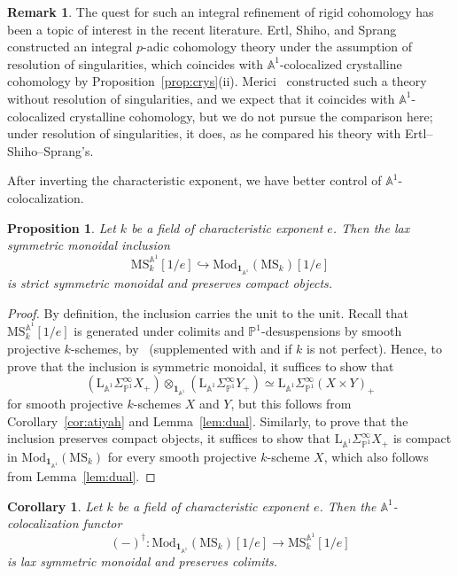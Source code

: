 \documentclass{amsart}
\numberwithin{equation}{section}
\theoremstyle{plain}
\newtheorem{proposition}[equation]{Proposition}
\newtheorem{corollary}[equation]{Corollary}
\theoremstyle{definition}
\newtheorem{remark}[equation]{Remark}
\let\bb=\mathbb
\def\A{\bb A}
\def\P{\bb P}
\def\1{\mathbf 1}
\def\ph{\mathord-}
\def\L{\mathrm{L}{}}
\let\into=\hookrightarrow
\let\cat=\mathrm
\def\Mod{\cat{M}\mathrm{od}{}}
\def\MS{\mathrm{MS}}
\begin{document}
\begin{remark}
The quest for such an integral refinement of rigid cohomology has been a topic of interest in the recent literature.
Ertl, Shiho, and Sprang~\cite{ESS} constructed an integral $p$-adic cohomology theory under the assumption of resolution of singularities, which coincides with $\A^1$-colocalized crystalline cohomology by Proposition~\ref{prop:crys}(ii).
Merici~\cite{Mer} constructed such a theory without resolution of singularities,  and we expect that it coincides with $\A^1$-colocalized crystalline cohomology, but we do not pursue the comparison here; under resolution of singularities, it does, as he compared his theory with Ertl--Shiho--Sprang's.
\end{remark}

After inverting the characteristic exponent, we have better control of $\A^1$-colocalization.

\begin{proposition}\label{prop:invchar}
Let $k$ be a field of characteristic exponent $e$.
Then the lax symmetric monoidal inclusion
\[
	\MS_k^{\A^1}[1/e] \into \Mod_{\1_{\A^1}}(\MS_k)[1/e]
\]
is strict symmetric monoidal and preserves compact objects.
\end{proposition}

\begin{proof}
By definition, the inclusion carries the unit to the unit.
Recall that $\MS_k^{\A^1}[1/e]$ is generated under colimits and $\P^1$-desuspensions by smooth projective $k$-schemes, by~\cite[Proposition~B.1]{LYZ} (supplemented with \cite[Corollary 2.1.7]{ElmantoKhan} and \cite[Lemma 1.12]{Suslin2017} if $k$ is not perfect).
Hence, to prove that the inclusion is symmetric monoidal, it suffices to show that
\[
	(\L_{\A^1}\Sigma_{\P^1}^\infty X_+)\otimes_{\1_{\A^1}}(\L_{\A^1}\Sigma_{\P^1}^\infty Y_+)
	\simeq \L_{\A^1}\Sigma_{\P^1}^\infty (X\times Y)_+
\]
for smooth projective $k$-schemes $X$ and $Y$, but this follows from Corollary~\ref{cor:atiyah} and Lemma~\ref{lem:dual}.
Similarly, to prove that the inclusion preserves compact objects, it suffices to show that $\L_{\A^1}\Sigma_{\P^1}^\infty X_+$ is compact in $\Mod_{\1_{\A^1}}(\MS_k)$ for every smooth projective $k$-scheme $X$, which also follows from Lemma~\ref{lem:dual}.
\end{proof}

\begin{corollary}\label{cor:invchar}
Let $k$ be a field of characteristic exponent $e$.
Then the $\A^1$-colocalization functor
\[
	(\ph)^\dagger \colon \Mod_{\1_{\A^1}}(\MS_k)[1/e] \to \MS_k^{\A^1}[1/e]
\]
is lax symmetric monoidal and preserves colimits.
\end{corollary}
\end{document}
